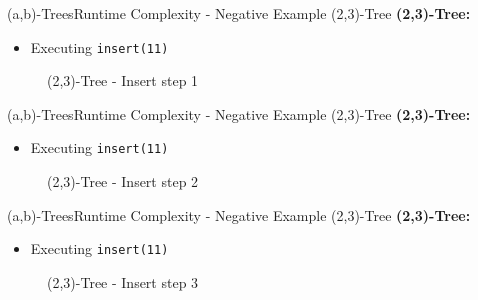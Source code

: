 
\begin{frame}{(a,b)-Trees}{Runtime Complexity - Negative Example (2,3)-Tree}
  \textbf{(2,3)-Tree:}
  \begin{itemize}
    \item
      Executing \texttt{\color{Mittel-Blau}insert(11)}
  \end{itemize}
  \begin{figure}
    \begin{adjustbox}{width=0.7\linewidth}
      
    \end{adjustbox}
    \label{fig:a_b_tree:2_3_tree_6}
    \caption{(2,3)-Tree - Insert step 1}
  \end{figure}
\end{frame}


\begin{frame}{(a,b)-Trees}{Runtime Complexity - Negative Example (2,3)-Tree}
  \textbf{(2,3)-Tree:}
  \begin{itemize}
    \item
      Executing \texttt{\color{Mittel-Blau}insert(11)}
  \end{itemize}
  \begin{figure}
    \begin{adjustbox}{width=0.7\linewidth}
      
    \end{adjustbox}
    \label{fig:a_b_tree:2_3_tree_7}
    \caption{(2,3)-Tree - Insert step 2}
  \end{figure}
\end{frame}


\begin{frame}{(a,b)-Trees}{Runtime Complexity - Negative Example (2,3)-Tree}
  \textbf{(2,3)-Tree:}
  \begin{itemize}
    \item
      Executing \texttt{\color{Mittel-Blau}insert(11)}
  \end{itemize}
  \begin{figure}
    \begin{adjustbox}{width=0.7\linewidth}
      
    \end{adjustbox}
    \label{fig:a_b_tree:2_3_tree_8}
    \caption{(2,3)-Tree - Insert step 3}
  \end{figure}
\end{frame}

